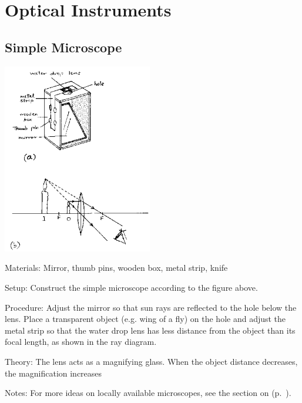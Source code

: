 \section{Optical Instruments} 

\begin{multicols}{2}


\subsection{Simple Microscope} 

\begin{center}
\includegraphics[width=0.49\textwidth]{./img/source/simple-microscope.png}
\end{center}

\begin{description*}
\item[Materials:]{Mirror, thumb pins, wooden box, metal strip, knife}
\item[Setup:]{Construct the simple microscope according to the figure above.}
\item[Procedure:]{Adjust the mirror so that sun rays are reflected to the hole below the lens. Place a transparent object (e.g. wing of a fly) on the hole and adjust the metal strip so that the water drop lens has less distance from the object than its focal length, as shown in the ray diagram.}
\item[Theory:]{The lens acts as a magnifying glass. When the object distance decreases, the magnification increases}
\item[Notes:]{For more ideas on locally available microscopes, see the section on  (p.~\pageref{cha:microscopy}).}
\end{description*}


\end{multicols}
